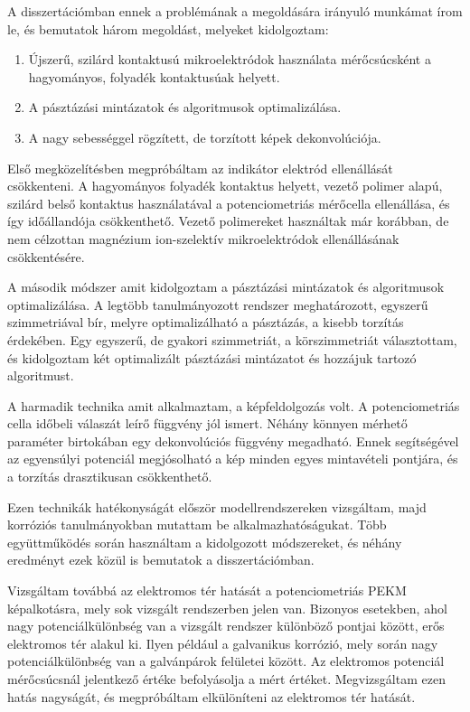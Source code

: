 A disszertációmban ennek a problémának a megoldására irányuló munkámat írom le, és bemutatok három megoldást, melyeket kidolgoztam:

\begin{enumerate}
\item Újszerű, szilárd kontaktusú mikroelektródok használata mérőcsúcsként a hagyományos, folyadék kontaktusúak helyett.
\item A pásztázási mintázatok és algoritmusok optimalizálása.
\item A nagy sebességgel rögzített, de torzított képek dekonvolúciója.
\end{enumerate}

Első megközelítésben megpróbáltam az indikátor elektród ellenállását csökkenteni.
A hagyományos folyadék kontaktus helyett, vezető polimer alapú, szilárd belső kontaktus használatával a potenciometriás mérőcella ellenállása, és így időállandója csökkenthető.
Vezető polimereket használtak már korábban, de nem célzottan magnézium ion-szelektív mikroelektródok ellenállásának csökkentésére.

A második módszer amit kidolgoztam a pásztázási mintázatok és algoritmusok optimalizálása.
A legtöbb tanulmányozott rendszer meghatározott, egyszerű szimmetriával bír, melyre optimalizálható a pásztázás, a kisebb torzítás érdekében.
Egy egyszerű, de gyakori szimmetriát, a körszimmetriát választottam, és kidolgoztam két optimalizált pásztázási mintázatot és hozzájuk tartozó algoritmust.

A harmadik technika amit alkalmaztam, a képfeldolgozás volt.
A potenciometriás cella időbeli válaszát leírő függvény jól ismert.
Néhány könnyen mérhető paraméter birtokában egy dekonvolúciós függvény megadható.
Ennek segítségével az egyensúlyi potenciál megjósolható a kép minden egyes mintavételi pontjára, és a torzítás drasztikusan csökkenthető.

Ezen technikák hatékonyságát először modellrendszereken vizsgáltam, majd korróziós tanulmányokban mutattam be alkalmazhatóságukat.
Több együttműködés során használtam a kidolgozott módszereket, és néhány eredményt ezek közül is bemutatok a disszertációmban.

Vizsgáltam továbbá az elektromos tér hatását a potenciometriás PEKM képalkotásra, mely sok vizsgált rendszerben jelen van.
Bizonyos esetekben, ahol nagy potenciálkülönbség van a vizsgált rendszer különböző pontjai között, erős elektromos tér alakul ki.
Ilyen például a galvanikus korrózió, mely során nagy potenciálkülönbség van a galvánpárok felületei között.
Az elektromos potenciál mérőcsúcsnál jelentkező értéke befolyásolja a mért értéket.
Megvizsgáltam ezen hatás nagyságát, és megpróbáltam elkülöníteni az elektromos tér hatását.
